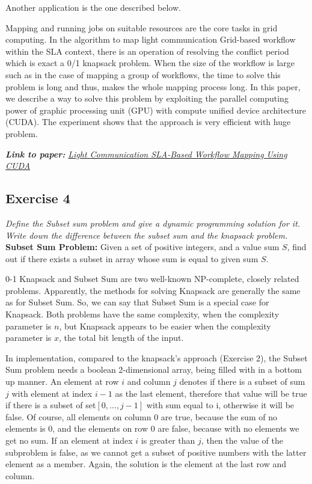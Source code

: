 \documentclass[12pt]{article}
\begin{document}
Another application is the one described below. \par 

Mapping and running jobs on suitable resources are the core tasks in grid computing. In the algorithm to map light communication Grid-based workflow within the SLA context, there is an operation of resolving the conflict period which is exact a 0/1 knapsack problem. When the size of the workflow is large such as in the case of mapping a group of workflows, the time to solve this problem is long and thus, makes the whole mapping process long. In this paper, we describe a way to solve this problem by exploiting the parallel computing power of graphic processing unit (GPU) with compute unified device architecture (CUDA). The experiment shows that the approach is very efficient with huge problem.

\textit{\textbf{Link to paper:} \hyperlink{https://ieeexplore.ieee.org/abstract/document/5282978}{Light Communication SLA-Based Workflow Mapping Using CUDA}}

\newpage

\subsection*{Exercise 4}
\textit{Define the Subset sum problem and give a dynamic programming solution for
it. Write down the difference between the subset sum and the knapsack problem.}\\ \newline
\textbf{Subset Sum Problem:} Given a set of positive integers, and a value sum $S$, find out if there exists a subset in array whose sum is equal to given sum $S$. \par
0-1 Knapsack and Subset Sum are two well-known NP-complete, closely related problems. Apparently, the methods for solving Knapsack are generally the same as for Subset Sum. So, we can say that Subset Sum is a special case for Knapsack. Both problems have the same complexity, when the complexity parameter is $n$, but Knapsack appears to be easier when the complexity parameter is $x$, the total bit length of the input. \par In implementation, compared to the knapsack's approach (Exercise 2), the Subset Sum problem needs a boolean 2-dimensional array, being filled with in a bottom up manner. An element at row $i$ and column $j$ denotes if there is a subset of sum $j$ with element at index $i-1$ as the last element, therefore that value will be true if there is a subset of set$[0,\ldots,j-1]$ with sum equal to i, otherwise it will be false. Of course, all elements on column 0 are true, because the sum of no elements is $0$, and the elements on row $0$ are false, because with no elements we get no sum. If an element at index $i$ is greater than $j$, then the value of the subproblem is false, as we cannot get a subset of positive numbers with the latter element as a member.  Again, the solution is the element at the last row and column.\\
\end{document}
